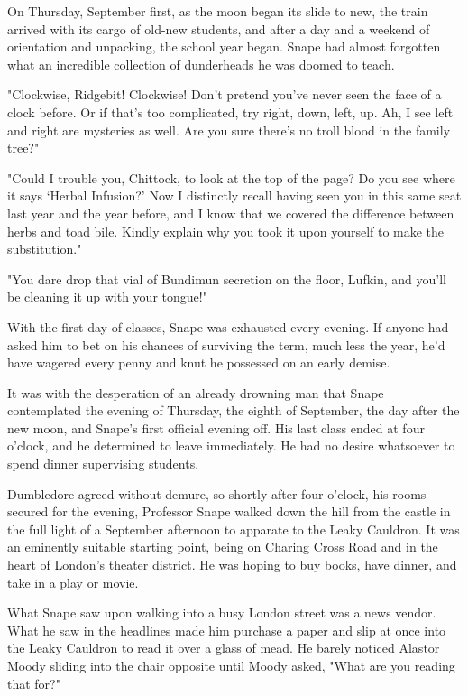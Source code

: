 \documentclass[a4paper,11pt]{article}
\begin{document}
On Thursday, September first, as the moon began its slide to new, the train arrived with its cargo of old-new students, and after a day and a weekend of orientation and unpacking, the school year began. Snape had almost forgotten what an incredible collection of dunderheads he was doomed to teach.

"Clockwise, Ridgebit! Clockwise! Don't pretend you've never seen the face of a clock before. Or if that's too complicated, try right, down, left, up. Ah, I see left and right are mysteries as well. Are you sure there's no troll blood in the family tree?"

"Could I trouble you, Chittock, to look at the top of the page? Do you see where it says `Herbal Infusion?' Now I distinctly recall having seen you in this same seat last year and the year before, and I know that we covered the difference between herbs and toad bile. Kindly explain why you took it upon yourself to make the substitution."

"You dare drop that vial of Bundimun secretion on the floor, Lufkin, and you'll be cleaning it up with your tongue!"

With the first day of classes, Snape was exhausted every evening. If anyone had asked him to bet on his chances of surviving the term, much less the year, he'd have wagered every penny and knut he possessed on an early demise.

It was with the desperation of an already drowning man that Snape contemplated the evening of Thursday, the eighth of September, the day after the new moon, and Snape's first official evening off. His last class ended at four o'clock, and he determined to leave immediately. He had no desire whatsoever to spend dinner supervising students.

Dumbledore agreed without demure, so shortly after four o'clock, his rooms secured for the evening, Professor Snape walked down the hill from the castle in the full light of a September afternoon to apparate to the Leaky Cauldron. It was an eminently suitable starting point, being on Charing Cross Road and in the heart of London's theater district. He was hoping to buy books, have dinner, and take in a play or movie.

What Snape saw upon walking into a busy London street was a news vendor. What he saw in the headlines made him purchase a paper and slip at once into the Leaky Cauldron to read it over a glass of mead. He barely noticed Alastor Moody sliding into the chair opposite until Moody asked, "What are you reading that for?"
\end{document}
